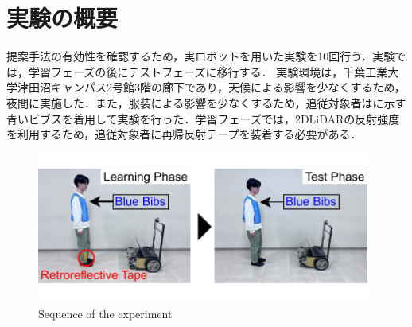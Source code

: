 
\section{実験の概要}

  提案手法の有効性を確認するため，実ロボットを用いた実験を10回行う．実験では，学習フェーズの後にテストフェーズに移行する．
  実験環境は，千葉工業大学津田沼キャンパス2号館3階の廊下であり，天候による影響を少なくするため，夜間に実施した．また，服装による影響を少なくするため，追従対象者はに示す青いビブスを着用して実験を行った．学習フェーズでは，2DLiDARの反射強度を利用するため，追従対象者に再帰反射テープを装着する必要がある．

  \begin{figure}[h]
    \centering
    \includegraphics[width=11cm] {images/pdf/RobotGuidance_blue_bibs}
    \captionsetup{justification=raggedright} %
    \caption{Sequence of the experiment}
    \label{Fig:Sequence of the experiment}
  \end{figure}

\newpage
